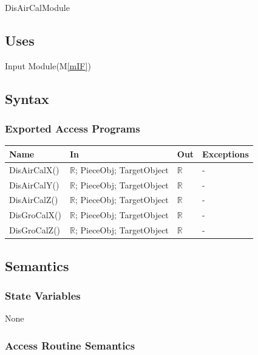 \documentclass[12pt, titlepage]{article}
\newcommand{\mref}[1]{M\ref{#1}}
\begin{document}
DisAirCalModule

\subsection{Uses}

Input Module(\mref{mIF})
\subsection{Syntax}

\subsubsection{Exported Access Programs}

\begin{center}
	\begin{tabular}{p{3cm} p{6cm} p{4cm} p{2cm}}
		\hline
		\textbf{Name} & \textbf{In} & \textbf{Out} & \textbf{Exceptions} \\
		\hline
		DisAirCalX() & $\mathbb{R}$; PieceObj; TargetObject & $\mathbb{R}$ & - \\
		DisAirCalY() & $\mathbb{R}$; PieceObj; TargetObject & $\mathbb{R}$ & - \\
		DisAirCalZ() & $\mathbb{R}$; PieceObj; TargetObject & $\mathbb{R}$ & - \\
		DisGroCalX() & $\mathbb{R}$; PieceObj; TargetObject & $\mathbb{R}$ & - \\
		DisGroCalZ() & $\mathbb{R}$; PieceObj; TargetObject & $\mathbb{R}$ & - \\
		\hline
	\end{tabular}
\end{center}

\subsection{Semantics}

\subsubsection{State Variables}

None

\subsubsection{Access Routine Semantics}
\end{document}
